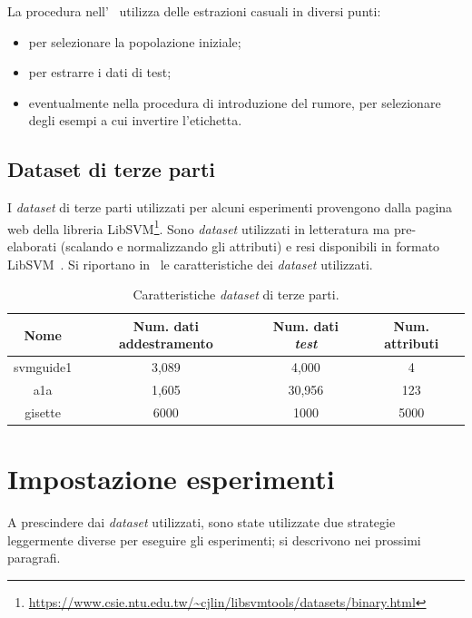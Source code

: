 La procedura nell'~ utilizza delle estrazioni casuali in diversi punti:
\begin{itemize}
    \item per selezionare la popolazione iniziale;
    \item per estrarre i dati di test;
    \item eventualmente nella procedura di introduzione del rumore, per selezionare degli esempi a cui invertire l'etichetta.
\end{itemize}

\subsection{Dataset di terze parti}
I \emph{dataset} di terze parti utilizzati per alcuni esperimenti provengono dalla pagina web della libreria LibSVM\footnote{\url{https://www.csie.ntu.edu.tw/~cjlin/libsvmtools/datasets/binary.html}}.
Sono \emph{dataset} utilizzati in letteratura ma pre-elaborati (scalando e normalizzando gli attributi) e resi disponibili in formato LibSVM~\cite{libsvm}.
Si riportano in~ le caratteristiche dei \emph{dataset} utilizzati.
\begin{table}
    \centering
    \begin{tabular}{cccc}
        \toprule
        Nome & Num. dati addestramento & Num. dati \emph{test} & Num. attributi\\
        \midrule
        svmguide1 &  3,089 & 4,000 & 4 \\
        a1a & 1,605	& 30,956 & 123\\
        gisette & 6000 & 1000 & 5000 \\
        \bottomrule
    \end{tabular}
    \caption{Caratteristiche \emph{dataset} di terze parti.}
    \label{tab:uci_datasets}
\end{table}


\section{Impostazione esperimenti}
A prescindere dai \emph{dataset} utilizzati, sono state utilizzate due strategie leggermente diverse per eseguire gli esperimenti; si descrivono nei prossimi paragrafi.

